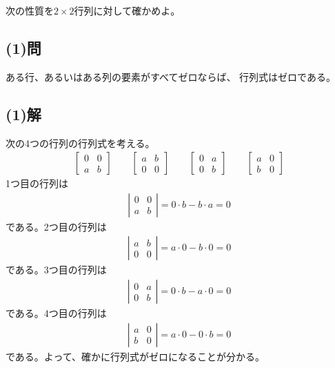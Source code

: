 次の性質を$2\times 2$行列に対して確かめよ。
\subsection{(1)問}
ある行、あるいはある列の要素がすべてゼロならば、
行列式はゼロである。

\subsection{(1)解}
次の4つの行列の行列式を考える。
\begin{align}
	\left[
	\begin{array}{cc}
		0 & 0 \\
		a & b
	\end{array}
	\right] \qquad
%
%
	\left[
	\begin{array}{cc}
		a & b \\
		0 & 0
	\end{array}
	\right] \qquad
%
%
	\left[
	\begin{array}{cc}
		0 & a \\
		0 & b
	\end{array}
	\right] \qquad
%
%
	\left[
	\begin{array}{cc}
		a & 0 \\
		b & 0
	\end{array}
	\right]
\end{align}
1つ目の行列は
\begin{align}
	\left|
	\begin{array}{cc}
		0 & 0 \\
		a & b
	\end{array}
	\right|
=
	0 \cdot b - b \cdot a
=
	0
\end{align}
である。2つ目の行列は
\begin{align}
	\left|
	\begin{array}{cc}
		a & b \\
		0 & 0
	\end{array}
	\right|
=
	a \cdot 0 - b \cdot 0
=
	0
\end{align}
である。3つ目の行列は
\begin{align}
	\left|
	\begin{array}{cc}
		0 & a \\
		0 & b
	\end{array}
	\right|
=
	0 \cdot b - a \cdot 0
=
	0
\end{align}
である。4つ目の行列は
\begin{align}
	\left|
	\begin{array}{cc}
		a & 0 \\
		b & 0
	\end{array}
	\right|
=
	a \cdot 0 - 0 \cdot b
=
	0
\end{align}
である。よって、確かに行列式がゼロになることが分かる。


